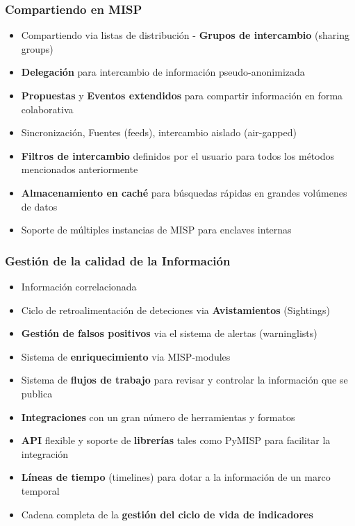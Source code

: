 \begin{frame}
\frametitle{Compartiendo en MISP}
    \begin{itemize}
        \item Compartiendo via listas de distribución - {\bf Grupos de intercambio} (sharing groups)
        \item {\bf Delegación} para intercambio de información pseudo-anonimizada
        \item {\bf Propuestas} y {\bf Eventos extendidos} para compartir información en forma colaborativa
        \item Sincronización, Fuentes (feeds), intercambio aislado (air-gapped)
        \item {\bf Filtros de intercambio } definidos por el usuario para todos los métodos mencionados anteriormente
        \item {\bf Almacenamiento en caché} para búsquedas rápidas en grandes volúmenes de datos
        \item Soporte de múltiples instancias de MISP para enclaves internas
    \end{itemize}
\end{frame}

\begin{frame}
\frametitle{Gestión de la calidad de la Información}
    \begin{itemize}
        \item Información correlacionada
        \item Ciclo de retroalimentación de deteciones via {\bf Avistamientos} (Sightings)
        \item {\bf Gestión de falsos positivos} via el sistema de alertas (warninglists)
        \item Sistema de {\bf enriquecimiento} via MISP-modules
        \item Sistema de {\bf flujos de trabajo} para revisar y controlar la información que se publica
        \item {\bf Integraciones} con un gran número de herramientas y formatos
        \item {\bf API} flexible y soporte de {\bf librerías} tales como PyMISP para facilitar la integración
        \item {\bf Líneas de tiempo} (timelines) para dotar a la información de un marco temporal
        \item Cadena completa de la {\bf gestión del ciclo de vida de indicadores}
    \end{itemize}
\end{frame}

